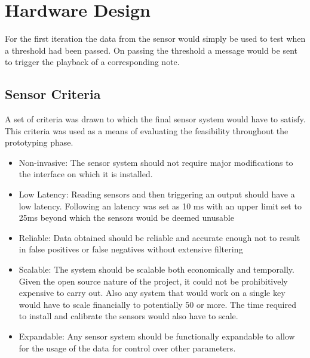 


\section{Hardware Design}

For the first iteration the data from the sensor would simply be used to
test when a threshold had been passed. On passing the threshold a
message would be sent to trigger the playback of a corresponding note.


\subsection{Sensor Criteria}\label{sensor-criteria}

A set of criteria was drawn to which the final sensor system would have
to satisfy. This criteria was used as a means of evaluating the
feasibility throughout the prototyping phase.

\begin{itemize}
\item
  Non-invasive: The sensor system should not require major modifications
  to the interface on which it is installed.
\item
  Low Latency: Reading sensors and then triggering an output should have
  a low latency. Following \cite{Jack2016} an latency was set as 10 ms
  with an upper limit set to 25ms beyond which the sensors would be
  deemed unusable
\item
  Reliable: Data obtained should be reliable and accurate enough not to
  result in false positives or false negatives without extensive
  filtering
\item
  Scalable: The system should be scalable both economically and
  temporally. Given the open source nature of the project, it could not
  be prohibitively expensive to carry out. Also any system that would
  work on a single key would have to scale financially to potentially 50
  or more. The time required to install and calibrate the sensors would
  also have to scale.
\item
  Expandable: Any sensor system should be functionally expandable to
  allow for the usage of the data for control over other parameters.
\end{itemize}

